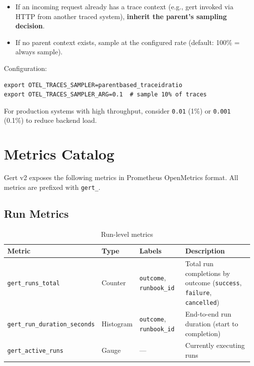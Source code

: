 \begin{itemize}
  \item If an incoming request already has a trace context (e.g., gert invoked via HTTP from another traced system), \textbf{inherit the parent's sampling decision}.
  \item If no parent context exists, sample at the configured rate (default: 100\% = always sample).
\end{itemize}

Configuration:

\begin{verbatim}
export OTEL_TRACES_SAMPLER=parentbased_traceidratio
export OTEL_TRACES_SAMPLER_ARG=0.1  # sample 10% of traces
\end{verbatim}

For production systems with high throughput, consider \texttt{0.01} (1\%) or \texttt{0.001} (0.1\%) to reduce backend load.

\section{Metrics Catalog}

Gert v2 exposes the following metrics in Prometheus OpenMetrics format. All metrics are prefixed with \texttt{gert\_}.

\subsection{Run Metrics}

\begin{table}[h]
\centering
\begin{tabular}{|p{4.5cm}|p{1.5cm}|p{3.5cm}|p{5.5cm}|}
\hline
\textbf{Metric} & \textbf{Type} & \textbf{Labels} & \textbf{Description} \\
\hline
\texttt{gert\_runs\_total} & Counter & \texttt{outcome}, \texttt{runbook\_id} & Total run completions by outcome (\texttt{success}, \texttt{failure}, \texttt{cancelled}) \\
\hline
\texttt{gert\_run\_duration\_seconds} & Histogram & \texttt{outcome}, \texttt{runbook\_id} & End-to-end run duration (start to completion) \\
\hline
\texttt{gert\_active\_runs} & Gauge & — & Currently executing runs \\
\hline
\end{tabular}
\caption{Run-level metrics}
\end{table}

